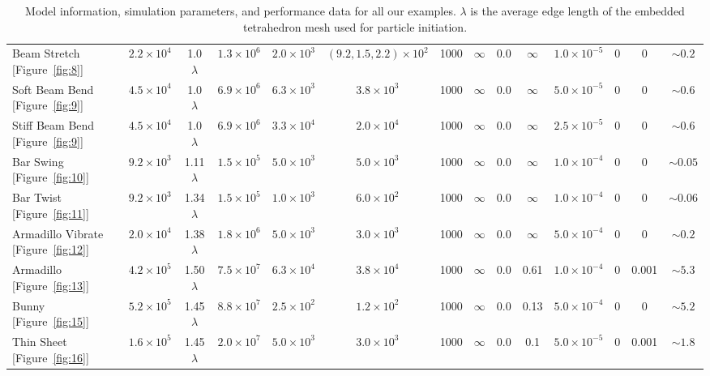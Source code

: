 \begin{table}[htb]
{\begin{tabular}{lccccccccccccc}
  Beam Stretch [Figure~\ref{fig:8}]        & $2.2\times10^4$ & 1.0 $\lambda$ & $1.3\times10^6$ & $2.0\times10^3$   & $(9.2,1.5,2.2)\times10^2$& 1000 & $\infty$  & 0.0             &$\infty$  & $1.0\times10^{-5}$ &0&0& $\sim0.2$ \\
  Soft Beam Bend [Figure~\ref{fig:9}]      & $4.5\times10^4$ & 1.0 $\lambda$ & $6.9\times10^6$ & $6.3\times10^3$   & $3.8\times10^3$          & 1000 & $\infty $ & 0.0             & $\infty$ & $5.0\times10^{-5}$   &0&0& $\sim0.6$ \\
  Stiff Beam Bend [Figure~\ref{fig:9}]     & $4.5\times10^4$ & 1.0 $\lambda$ & $6.9\times10^6$ & $3.3\times10^4$   & $2.0\times10^4$          & 1000 & $\infty $ & 0.0             & $\infty$ & $2.5\times10^{-5}$ &0&0& $\sim0.6$ \\
  Bar Swing [Figure~\ref{fig:10}]     & $9.2\times10^3$ & 1.11 $\lambda$ & $1.5\times10^5$ & $5.0\times10^3$   & $5.0\times10^3$          & 1000 & $\infty $ & 0.0             & $\infty$ & $1.0\times10^{-4}$ &0&0& $\sim0.05$ \\
  Bar Twist [Figure~\ref{fig:11}]     & $9.2\times10^3$ & 1.34 $\lambda$ & $1.5\times10^5$ & $1.0\times10^3$   & $6.0\times10^2$          & 1000 & $\infty $ & 0.0             & $\infty$ & $1.0\times10^{-4}$ &0&0& $\sim0.06$ \\
  Armadillo Vibrate [Figure~\ref{fig:12}]     & $2.0\times10^4$ & 1.38 $\lambda$ & $1.8\times10^6$ & $5.0\times10^3$   & $3.0\times10^3$          & 1000 & $\infty $ & 0.0             & $\infty$ & $5.0\times10^{-4}$ &0&0& $\sim0.2$ \\
  Armadillo [Figure~\ref{fig:13}]          & $4.2\times10^5$ & 1.50$\lambda$ & $7.5\times10^7$ & $6.3\times10^4$   & $3.8\times10^4$          & 1000 & $\infty $ & 0.0             & 0.61     & $1.0\times10^{-4}$          &0&0.001& $\sim5.3$ \\
  Bunny [Figure~\ref{fig:15}]              & $5.2\times10^5$ & 1.45$\lambda$ & $8.8\times10^7$ & $2.5\times10^2$   & $1.2\times10^2$          & 1000 & $\infty $ & 0.0             & 0.13     & $5.0\times10^{-4}$          &0&0& $\sim5.2$ \\
  Thin Sheet [Figure~\ref{fig:16}]              & $1.6\times10^5$ & 1.45$\lambda$ & $2.0\times10^7$ & $5.0\times10^3$   & $3.0\times10^3$          & 1000 & $\infty $ & 0.0             & 0.1     & $5.0\times10^{-5}$          &0&0.001& $\sim1.8$ \\
  \hline
\end{tabular}
}
\caption{Model information, simulation parameters, and performance data for all our examples. $\lambda$ is the average edge length of the embedded tetrahedron mesh used for particle initiation.}
\label{tab:1}
\end{table}

